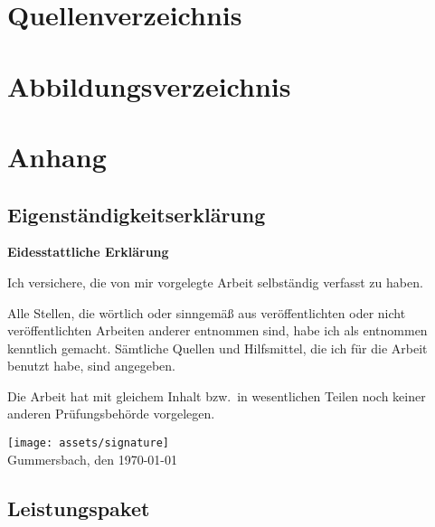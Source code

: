 \appendix

\newpage


\section{Quellenverzeichnis}

\printbibliography


\section{Abbildungsverzeichnis}
\listoffigures


\section{Anhang}

\subsection{Eigenständigkeitserklärung}

\textbf{Eidesstattliche Erklärung}

Ich versichere, die von mir vorgelegte Arbeit selbständig verfasst zu haben.

Alle Stellen, die wörtlich oder sinngemäß aus veröffentlichten oder nicht veröffentlichten Arbeiten anderer entnommen sind, habe ich als entnommen kenntlich gemacht.
Sämtliche Quellen und Hilfsmittel, die ich für die Arbeit benutzt habe, sind angegeben.

Die Arbeit hat mit gleichem Inhalt bzw.\ in wesentlichen Teilen noch keiner anderen Prüfungsbehörde vorgelegen.

\texttt{[image: assets/signature]}\\
Gummersbach, den \today

\newpage

\subsection{Leistungspaket}\label{subsec:leistungspaket}
\newpage
{}\newpage
{}\newpage
{}\newpage
{}\newpage
{}\newpage

